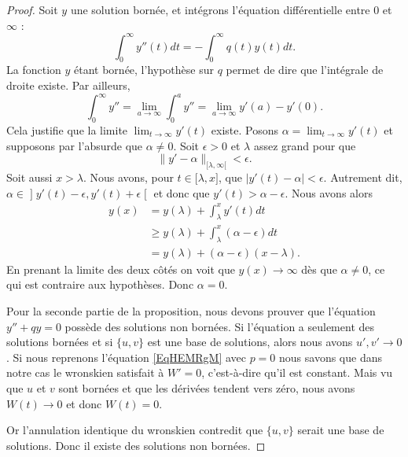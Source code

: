 \begin{proof}
	Soit \( y\) une solution bornée, et intégrons l'équation différentielle entre \( 0\) et \( \infty\) :
	\begin{equation}
		\int_0^{\infty}y''(t)dt=-\int_0^{\infty}q(t)y(t)dt.
	\end{equation}
	La fonction \( y\) étant bornée, l'hypothèse sur \( q\) permet de dire que l'intégrale de droite existe. Par ailleurs,
	\begin{equation}
		\int_0^{\infty}y''=\lim_{a\to \infty}\int_0^ay''=\lim_{a\to \infty}y'(a)-y'(0).
	\end{equation}
	Cela justifie que la limite \( \lim_{t\to \infty} y'(t)\) existe. Posons \( \alpha=\lim_{t\to \infty} y'(t)\) et supposons par l'absurde que \( \alpha\neq 0\). Soit \( \epsilon>0\) et \( \lambda\) assez grand pour que
	\begin{equation}
		\| y'-\alpha \|_{\mathopen[ \lambda , \infty [}<\epsilon.
	\end{equation}
	Soit aussi \( x>\lambda\). Nous avons, pour \( t\in \mathopen[ \lambda,x\mathclose]\), que \( | y'(t)-\alpha |<\epsilon\). Autrement dit, \( \alpha\in\mathopen] y'(t)-\epsilon,y'(t)+\epsilon\mathclose[\) et donc que \( y'(t)>\alpha-\epsilon\). Nous avons alors
	\begin{subequations}
		\begin{align}
			y(x) & =y(\lambda) + \int_{\lambda}^x y'(t)dt                  \\
			     & \geq y(\lambda) + \int_{\lambda}^x (\alpha-\epsilon) dt \\
			     & =y(\lambda) + (\alpha-\epsilon)(x - \lambda).
		\end{align}
	\end{subequations}
	En prenant la limite des deux côtés on voit que \( y(x)\to \infty\) dès que \( \alpha\neq 0\), ce qui est contraire aux hypothèses. Donc \( \alpha=0\).

	Pour la seconde partie de la proposition, nous devons prouver que l'équation \( y''+qy=0\) possède des solutions non bornées. Si l'équation a seulement des solutions bornées et si \( \{ u,v \}\) est une base de solutions, alors nous avons \( u',v'\to 0\). Si nous reprenons l'équation \eqref{EqHEMRgM} avec \( p=0\) nous savons que dans notre cas le wronskien satisfait à \( W'=0\), c'est-à-dire qu'il est constant. Mais vu que \( u\) et \( v\) sont bornées et que les dérivées tendent vers zéro, nous avons \( W(t)\to 0\) et donc \( W(t)=0\).

	Or l'annulation identique du wronskien contredit que \( \{ u,v \}\) serait une base de solutions. Donc il existe des solutions non bornées.
\end{proof}

